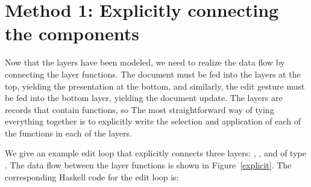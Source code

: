 %																
%																
%																
\section{Method 1: Explicitly connecting the components} \label{sect:simple}

Now that the layers have been modeled, we need to realize the data flow by connecting the layer functions. The document must be fed into the layers at the top, yielding the presentation at the bottom, and similarly, the edit gesture must be fed into the bottom layer, yielding the document update. \bc The layers are records that contain functions, so  \ec The most straightforward way of tying everything together is to explicitly write the selection and application of each of the functions in each of the layers. 

We give an example edit loop that explicitly connects three layers: , , and  of type . The data flow between the layer functions is shown in Figure~\ref{explicit}. The corresponding Haskell code for the edit loop is:


